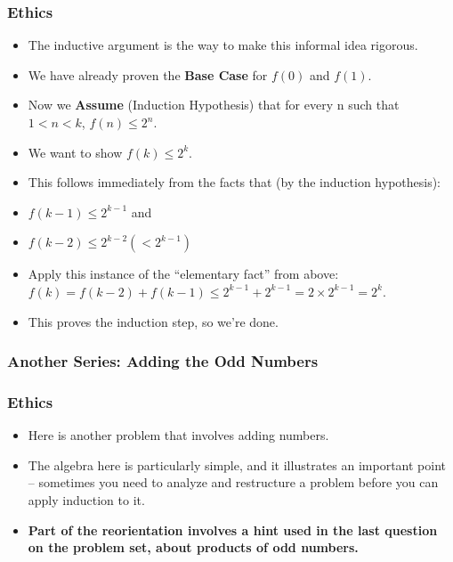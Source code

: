 \begin{frame}
\frametitle{Ethics}

\begin{itemize}[<+->]
\item The inductive argument is the way to make this informal idea rigorous. 

\item 

We have already proven the {\bf{Base Case}} for $f(0)$ and $f(1)$.

\item Now we {\bf{Assume}} (Induction Hypothesis) that for every n such that $1 < n < k$,
$f(n) \leq 2^n$. 

\item We want to show $f(k) \leq 2^k$. 

\item This follows immediately from the facts that (by the induction hypothesis):

\item $f(k-1) \leq 2^{k-1}$ and

\item $f(k-2) \leq  2^{k-2} (< 2^{k-1})$

\item Apply this instance of the ``elementary fact'' from above:
$f(k) = f(k-2) + f(k-1) \leq 2^{k-1} + 2^{k-1} = 2 \times 2^{k-1} = 2^k$.

\item \noindent This proves the induction step, so we're done.


\end{itemize} 
\end{frame}




\subsubsection{Another Series: Adding the Odd Numbers}

\begin{frame}
\frametitle{Ethics}

\begin{itemize}[<+->]

\item Here is another problem that involves adding numbers.

\item The algebra here is particularly simple, and it illustrates an important point -- sometimes you need to analyze and restructure a problem before you can apply induction to it.

\item {\bf{Part of the reorientation involves a hint used in the last question on the problem set, about products of odd numbers.}}

\end{itemize} 
\end{frame}


